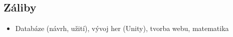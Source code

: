 \subsection{Záliby}{
    \begin{itemize}
        \item Databáze (návrh, užití), vývoj her (Unity), tvorba webu, matematika
    \end{itemize}
}